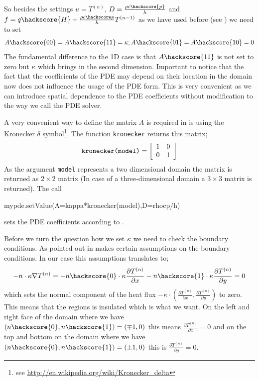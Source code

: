 So besides the settings $u=T^{(n)}$, $D = \frac{\rho c \hackscore{p}}{h}$ and
$f = q \hackscore{H} + \frac{\rho c\hackscore p}{h} T^{(n-1)}$ as we have used before (see ) we need to set
\begin{equation}\label{eqn: kappa general}
A\hackscore{00}=A\hackscore{11}=\kappa; A\hackscore{01}=A\hackscore{10}=0
\end{equation}
The fundamental difference to the 1D case is that $A\hackscore{11}$ is not set to zero but $\kappa$ 
which brings in the second dimension. Important to notice that the fact that the coefficients 
of the PDE may depend on their location in the domain now does not influence the usage of the PDE form. This is very convenient as we can introduce spatial dependence to the PDE coefficients without modification to the way we call the PDE solver. 

A very convenient way to define the matrix $A$ is required in  is using the 
Kronecker $\delta$ symbol\footnote{see \url{http://en.wikipedia.org/wiki/Kronecker_delta}}. The 
\esc function \verb|kronecker| returns this matrix;
\begin{equation}
\verb|kronecker(model)| = \left[ 
\begin{array}{cc}
 1 & 0 \\
 0 & 1 \\
\end{array}
\right]
\end{equation}
As the argument \verb|model| represents a two dimensional domain the matrix is returned as $2 \times 2$ matrix
(In case of a three-dimensional domain a $3 \times 3$ matrix is returned). The call 
\begin{python}
mypde.setValue(A=kappa*kronecker(model),D=rhocp/h)
\end{python}
sets the PDE coefficients according to .  

Before we turn the question how we set $\kappa$ we need to check the boundary conditions. As
pointed out in  makes certain assumptions on the boundary conditions. In our case
this assumptions translates to;
\begin{equation}
-n \cdot \kappa \nabla T^{(n)} = 
-n\hackscore{0} \cdot \kappa \frac{\partial T^{(n)}}{\partial x} - n\hackscore{1} \cdot  \kappa \frac{\partial T^{(n)}}{\partial y} = 0
\label{eq:hom flux}
\end{equation}
which sets the normal component of the heat flux $- \kappa \cdot (\frac{\partial T^{(n)}}{\partial x}, \frac{\partial T^{(n)}}{\partial y})$ to zero. This means that the regions is insulated which is what we want. 
On the left and right face of the domain where we have $(n\hackscore{0},n\hackscore{1} ) = (\mp 1,0)$ 
this means $\frac{\partial T^{(n)}}{\partial x}=0$ and on the top and bottom on the domain 
where we have  $(n\hackscore{0},n\hackscore{1} ) = (\pm 1,0)$ this is $\frac{\partial T^{(n)}}{\partial y}=0$. 

